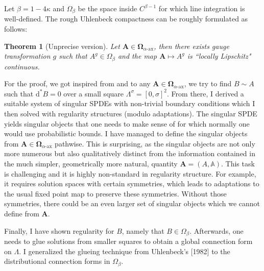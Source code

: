 \documentclass[11pt]{article}
\numberwithin{equation}{section}
\newtheorem{theorem}{Theorem}[section]
\theoremstyle{definition}
\theoremstyle{remark}
\newcommand{\diff}{\mathrm{d}}
\newcommand{\1}{\mathbf 1}
\newcommand{\<}{\langle}
\renewcommand{\>}{\rangle}
\newcommand{\ax}{\text{-}\mathrm{ax}}
\newcommand{\bfA}{\mathbf A}
\newcommand{\bA}{\mathbb A}
\newcommand{\bfOmega}{\boldsymbol{\Omega}}
\begin{document}
Let $\beta=1-4\kappa$ and $\Omega_\beta$ be the space inside $C^{\beta-1}$ for which line integration is well-defined.  The rough Uhlenbeck compactness can be roughly formulated as follows:
\begin{theorem}[Unprecise version] Let $\bfA\in \bfOmega_{\alpha\ax}$, then there exists gauge transformation $g$ such that $A^g\in \Omega_\beta$ and the map $\bfA\mapsto A^g$ is ``locally Lipschitz" continuous.   
\end{theorem}
%
For the proof, we got inspired from \cite{Uhlenbeck82} and to any $\bfA\in\bfOmega_{\alpha\ax}$,  we try to find $B\sim A$ such that $\diff^*B=0$ over a small square $\Lambda^\sigma=[0,\sigma]^2$. From there, I derived a suitable system of singular SPDEs with non-trivial boundary conditions which I then solved with regularity structures (modulo adaptations). 
%
%
The singular SPDE yields singular objects 
that one needs to make sense of for which normally one would use probabilistic bounds. I have managed to define the singular objects from $\bfA\in\bfOmega_{\alpha\ax}$ pathwise. This is surprising, as the singular objects are not only more numerous but also qualitatively distinct from the information contained in the much simpler, geometrically more natural, quantity $\bfA=(A,\bA)$.  This task is challenging and it is highly non-standard in regularity structure. For example, it requires solution spaces with certain symmetries, which leads to adaptations to the usual fixed point map to preserve these symmetries. Without those symmetries, there could be an even larger set of singular objects which we cannot define from $\bfA$. 
%

Finally, I have shown regularity for $B$, namely that $B\in\Omega_\beta$. Afterwards, one needs to glue solutions from smaller squares to obtain a global connection form on $\Lambda$. I generalized the glueing technique from Uhlenbeck's [1982] to the distributional connection forms in $\Omega_\beta$. 
\end{document}
